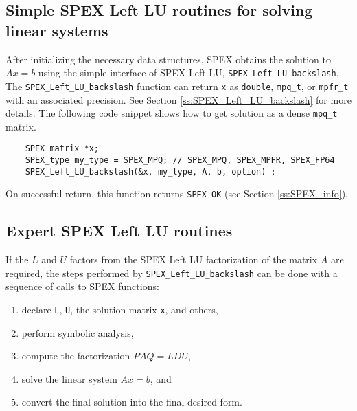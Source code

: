 \documentclass[12pt]{report}
\theoremstyle{definition}
\begin{document}
\cprotect\subsection{Simple SPEX Left LU routines for solving linear systems}
\label{s:Using:simple}

After initializing the necessary data structures, SPEX obtains the solution
to $Ax=b$ using the simple interface of SPEX Left LU, \verb|SPEX_Left_LU_backslash|.  The 
\newline \verb|SPEX_Left_LU_backslash| function can return \verb|x| as \verb|double|,
\verb|mpq_t|, or \verb|mpfr_t| with an associated precision.  See Section
\ref{ss:SPEX_Left_LU_backslash} for more details.  The following code snippet shows how
to get solution as a dense \verb|mpq_t| matrix.

{\small
\begin{verbatim}
    SPEX_matrix *x;
    SPEX_type my_type = SPEX_MPQ; // SPEX_MPQ, SPEX_MPFR, SPEX_FP64
    SPEX_Left_LU_backslash(&x, my_type, A, b, option) ; \end{verbatim} }

On successful return, this function returns \verb|SPEX_OK| (see Section
\ref{ss:SPEX_info}).

\cprotect\subsection{Expert SPEX Left LU routines}
\label{s:Using:expert}

If the $L$ and $U$ factors from the SPEX Left LU factorization of the matrix $A$
are required, the steps performed by \verb|SPEX_Left_LU_backslash| can be done with
a sequence of calls to SPEX functions:

\begin{enumerate}
\item declare \verb|L|, \verb|U|, the solution matrix \verb|x|, and others,
\item perform symbolic analysis,
\item compute the factorization $PAQ = L D U$, 
\item solve the linear system $Ax =b$, and
\item convert the final solution into the final desired form.
\end{enumerate}
\end{document}
